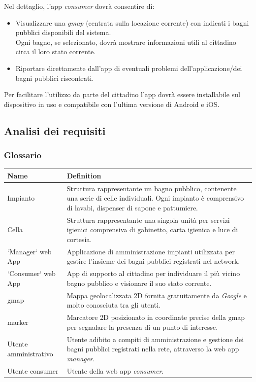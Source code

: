 \documentclass[12pt]{article}
\begin{document}
Nel dettaglio, l'app \textit{consumer} dovrà consentire di:
\begin{itemize}
\item Visualizzare una \textit{gmap} (centrata sulla locazione corrente) con indicati i bagni pubblici disponibili del sistema.\\Ogni bagno, se selezionato, dovrà mostrare informazioni utili al cittadino circa il loro stato corrente.
\item Riportare direttamente dall'app di eventuali problemi dell'applicazione/dei bagni pubblici riscontrati.
\end{itemize}
Per facilitare l'utilizzo da parte del cittadino l'app dovrà essere installabile sul dispositivo in uso e compatibile con l'ultima versione di Android e iOS.
\newpage
\subsection{Analisi dei requisiti}
\subsubsection{Glossario}

\begin{center}
    \begin{tabular}{ | l |  p{10cm} |}
    \hline
    \textbf{Name} & \textbf{Definition} \\ \hline
    Impianto & Struttura rappresentante un bagno pubblico, contenente una serie di celle individuali. Ogni impianto è comprensivo di lavabi, dispenser di sapone e pattumiere. \\ \hline
    Cella & Struttura rappresentante una singola unità per servizi igienici comprensiva di gabinetto, carta igienica e luce di cortesia. \\ \hline
    `Manager` web App & Applicazione di amministrazione impianti utilizzata per gestire l'insieme dei bagni pubblici registrati nel network.\\ \hline
    `Consumer` web App & App di supporto al cittadino per individuare il più vicino bagno pubblico e visionare il suo stato corrente.\\ \hline
    gmap & Mappa geolocalizzata 2D fornita gratuitamente da \textit{Google} e molto conosciuta tra gli utenti.\\ \hline
    marker & Marcatore 2D posizionato in coordinate precise della gmap per segnalare la presenza di un punto di interesse.\\ \hline
    Utente amministrativo & Utente adibito a compiti di amministrazione e gestione dei bagni pubblici registrati nella rete, attraverso la web app \textit{manager}.\\ \hline
    Utente consumer & Utente della web app \textit{consumer}. \\ \hline
    \end{tabular}
\end{center}	
\newpage
\end{document}

